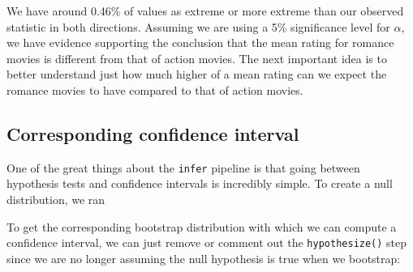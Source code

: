 \documentclass[12pt,]{krantz}
\makeatletter
\newenvironment{Shaded}{\begin{snugshade}}{\end{snugshade}}
\newcommand{\KeywordTok}[1]{\textcolor[rgb]{0.27,0.27,0.27}{\textbf{#1}}}
\newcommand{\DataTypeTok}[1]{\textcolor[rgb]{0.27,0.27,0.27}{#1}}
\newcommand{\DecValTok}[1]{\textcolor[rgb]{0.06,0.06,0.06}{#1}}
\newcommand{\StringTok}[1]{\textcolor[rgb]{0.5,0.5,0.5}{#1}}
\newcommand{\OperatorTok}[1]{\textcolor[rgb]{0.43,0.43,0.43}{\textbf{#1}}}
\newcommand{\NormalTok}[1]{#1}
\newenvironment{kframe}{%
\medskip{}
\setlength{\fboxsep}{.8em}
 \def\at@end@of@kframe{}%
 \ifinner\ifhmode%
  \def\at@end@of@kframe{\end{minipage}}%
  \begin{minipage}{\columnwidth}%
 \fi\fi%
 \def\FrameCommand##1{\hskip\@totalleftmargin \hskip-\fboxsep
 \colorbox{shadecolor}{##1}\hskip-\fboxsep
     \hskip-\linewidth \hskip-\@totalleftmargin \hskip\columnwidth}%
 \MakeFramed {\advance\hsize-\width
   \@totalleftmargin\z@ \linewidth\hsize
   \@setminipage}}%
 {\par\unskip\endMakeFramed%
 \at@end@of@kframe}
\renewenvironment{Shaded}{\begin{kframe}}{\end{kframe}}
\theoremstyle{definition}
\theoremstyle{definition}
\theoremstyle{definition}
\theoremstyle{remark}
\makeatother
\begin{document}
We have around 0.46\% of values as extreme or more extreme than our
observed statistic in both directions. Assuming we are using a 5\%
significance level for \(\alpha\), we have evidence supporting the
conclusion that the mean rating for romance movies is different from
that of action movies. The next important idea is to better understand
just how much higher of a mean rating can we expect the romance movies
to have compared to that of action movies.

\subsection{Corresponding confidence
interval}\label{corresponding-confidence-interval}

One of the great things about the \texttt{infer} pipeline is that going
between hypothesis tests and confidence intervals is incredibly simple.
To create a null distribution, we ran

\begin{Shaded}
\end{Shaded}

To get the corresponding bootstrap distribution with which we can
compute a confidence interval, we can just remove or comment out the
\texttt{hypothesize()} step since we are no longer assuming the null
hypothesis is true when we bootstrap:
\end{document}
